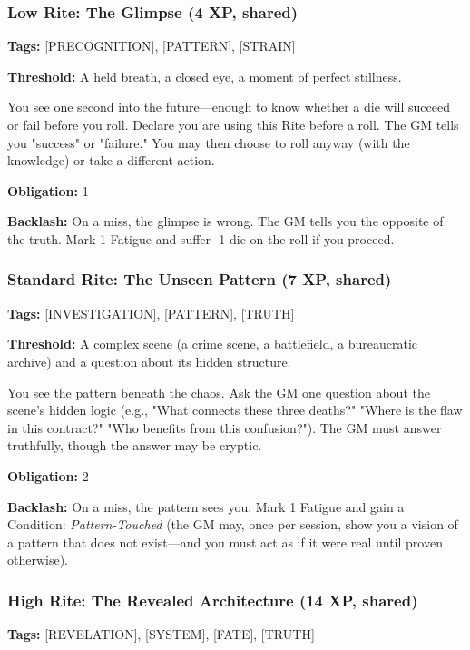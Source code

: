 \subsubsection{Low Rite: The Glimpse (4 XP, shared)}

\textbf{Tags:} [PRECOGNITION], [PATTERN], [STRAIN]

\textbf{Threshold:} A held breath, a closed eye, a moment of perfect stillness.

You see one second into the future—enough to know whether a die will succeed or fail before you roll. Declare you are using this Rite before a roll. The GM tells you "success" or "failure." You may then choose to roll anyway (with the knowledge) or take a different action.

\textbf{Obligation:} 1

\textbf{Backlash:} On a miss, the glimpse is wrong. The GM tells you the opposite of the truth. Mark 1 Fatigue and suffer -1 die on the roll if you proceed.

\subsubsection{Standard Rite: The Unseen Pattern (7 XP, shared)}

\textbf{Tags:} [INVESTIGATION], [PATTERN], [TRUTH]

\textbf{Threshold:} A complex scene (a crime scene, a battlefield, a bureaucratic archive) and a question about its hidden structure.

You see the pattern beneath the chaos. Ask the GM one question about the scene's hidden logic (e.g., "What connects these three deaths?" "Where is the flaw in this contract?" "Who benefits from this confusion?"). The GM must answer truthfully, though the answer may be cryptic.

\textbf{Obligation:} 2

\textbf{Backlash:} On a miss, the pattern sees you. Mark 1 Fatigue and gain a Condition: \textit{Pattern-Touched} (the GM may, once per session, show you a vision of a pattern that does not exist—and you must act as if it were real until proven otherwise).

\subsubsection{High Rite: The Revealed Architecture (14 XP, shared)}

\textbf{Tags:} [REVELATION], [SYSTEM], [FATE], [TRUTH]

